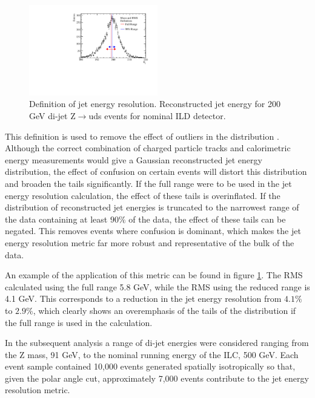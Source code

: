 \begin{figure}
\centering
\includegraphics[width=0.5\textwidth]{OptimisationStudies/Plots/MethodDescription/RMS90Plot.pdf}
\caption[Definition of jet energy resolution.   Reconstructed jet energy for 200 GeV di-jet Z$\rightarrow$uds events for nominal ILD detector.]{Definition of jet energy resolution.   Reconstructed jet energy for 200 GeV di-jet Z$\rightarrow$uds events for nominal ILD detector.}
\label{fig:rms90defintion}
\end{figure} 

This definition is used to remove the effect of outliers in the distribution \cite{arXiv:0907.3577}.  Although the correct combination of charged particle tracks and calorimetric energy measurements would give a Gaussian reconstructed jet energy distribution, the effect of confusion on certain events will distort this distribution and broaden the tails significantly.  If the full range were to be used in the jet energy resolution calculation, the effect of these tails is overinflated.  If the distribution of reconstructed jet energies is truncated to the narrowest range of the data containing at least $90\%$ of the data, the effect of these tails can be negated.  This removes events where confusion is dominant, which makes the jet energy resolution metric far more robust and representative of the bulk of the data.  

An example of the application of this metric can be found in figure \ref{fig:rms90defintion}.  The RMS calculated using the full range 5.8 GeV, while the RMS using the reduced range is 4.1 GeV.  This corresponds to a reduction in the jet energy resolution from $4.1\%$ to $2.9\%$, which clearly shows an overemphasis of the tails of the distribution if the full range is used in the calculation.

In the subsequent analysis a range of di-jet energies were considered ranging from the Z mass, 91 GeV, to the nominal running energy of the ILC, 500 GeV.  Each event sample contained 10,000 events generated spatially isotropically so that, given the polar angle cut, approximately 7,000 events contribute to the jet energy resolution metric. 

